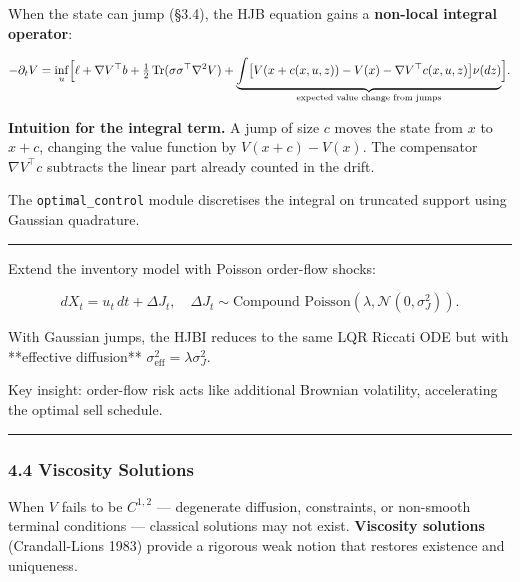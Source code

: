 \documentclass[11pt,a4paper]{article}
\begin{document}
When the state can jump (§3.4), the HJB equation gains a \textbf{non-local integral operator}:

\[-\partial_t V = \inf_{u}\Bigl[\ell + \nabla V^\top b + \tfrac12\operatorname{Tr}(\sigma\sigma^\top\nabla^2 V)
+ \underbrace{\int\bigl[V(x+c(x,u,z))-V(x)-\nabla V^\top c(x,u,z)\bigr]\nu(dz)}_{\text{expected value change from jumps}}\Bigr].\]

\textbf{Intuition for the integral term.} A jump of size \(c\) moves the state from \(x\) to \(x+c\), changing the value function by \(V(x+c)-V(x)\). The compensator \(\nabla V^\top c\) subtracts the linear part already counted in the drift.

The \texttt{optimal\_control} module discretises the integral on truncated support using Gaussian quadrature.

\begin{center}\rule{0.5\linewidth}{0.5pt}\end{center}

\begin{tcolorbox}[colback=notebg!60,colframe=optgreen,fonttitle=\bfseries\sffamily,title={\textsf{\textbf{Example}} — Example — Optimal Execution with Jump Risk},breakable]
Extend the inventory model with Poisson order-flow shocks:

$$dX_t = u_t\,dt + \Delta J_t,\quad \Delta J_t \sim \text{Compound Poisson}(\lambda, \mathcal{N}(0,\sigma_J^2)).$$

With Gaussian jumps, the HJBI reduces to the same LQR Riccati ODE but with
**effective diffusion** $\sigma_{\text{eff}}^2 = \lambda\sigma_J^2$.

Key insight: order-flow risk acts like additional Brownian volatility, accelerating
the optimal sell schedule.
\end{tcolorbox}

\begin{center}\rule{0.5\linewidth}{0.5pt}\end{center}

\subsubsection{4.4 Viscosity Solutions}\label{viscosity-solutions}

When \(V\) fails to be \(C^{1,2}\) --- degenerate diffusion, constraints, or non-smooth terminal conditions --- classical solutions may not exist. \textbf{Viscosity solutions} (Crandall-Lions 1983) provide a rigorous weak notion that restores existence and uniqueness.
\end{document}
